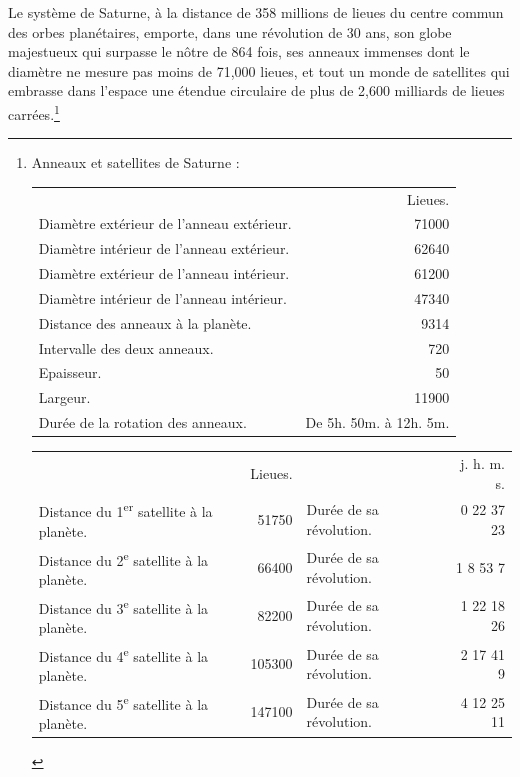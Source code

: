 \documentclass[a4paper, 11pt, oneside, landscape]{article}
\begin{document}
Le système de Saturne, à la distance de 358 millions de lieues du centre commun des orbes planétaires, emporte, dans une révolution de 30 ans, son globe majestueux qui surpasse le nôtre de 864 fois, ses anneaux immenses dont le diamètre ne mesure pas moins de 71,000 lieues, et tout un monde de satellites qui embrasse dans l'espace une étendue circulaire de plus de 2,600 milliards de lieues carrées.\footnote{Anneaux et satellites de Saturne :\\
\begin{table}[H]
    \centering\color{BrickRed}
    \bfseries
    \footnotesize
    \begin{tabular}{l r}
        ~ & Lieues.   \\
        Diamètre extérieur de l'anneau extérieur. & 71000 \\
        Diamètre intérieur de l'anneau extérieur. & 62640 \\
        Diamètre extérieur de l'anneau intérieur. & 61200 \\
        Diamètre intérieur de l'anneau intérieur. & 47340 \\
        Distance des anneaux à la planète. & 9314 \\
        Intervalle des deux anneaux. & 720 \\
        Epaisseur. & 50 \\
        Largeur. & 11900 \\
        Durée de la rotation des anneaux. & De 5h. 50m. à 12h. 5m. \\
    \end{tabular}
\end{table}
\begin{table}[H]
    \centering\color{BrickRed}
    \bfseries
    \footnotesize
    \begin{tabular}{l r l r}
        ~ & Lieues. & ~ & j. h. m. s.   \\
        Distance du 1\textsuperscript{er} satellite à la planète. & 51750 & Durée de sa révolution. & 0 22 37 23   \\
        Distance du 2\textsuperscript{e} satellite à la planète. & 66400 & Durée de sa révolution. & 1 8 53 7   \\
        Distance du 3\textsuperscript{e} satellite à la planète. & 82200 & Durée de sa révolution. & 1 22 18 26   \\
        Distance du 4\textsuperscript{e} satellite à la planète. & 105300 & Durée de sa révolution. & 2 17 41 9   \\
        Distance du 5\textsuperscript{e} satellite à la planète. & 147100 & Durée de sa révolution. & 4 12 25 11   \\

\end{tabular}
\end{table}}
\end{document}
